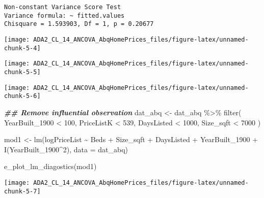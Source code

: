 \documentclass[
  12pt,
]{article}
\newenvironment{Shaded}{\begin{snugshade}}{\end{snugshade}}
\newcommand{\AttributeTok}[1]{\textcolor[rgb]{0.77,0.63,0.00}{#1}}
\newcommand{\DecValTok}[1]{\textcolor[rgb]{0.00,0.00,0.81}{#1}}
\newcommand{\DocumentationTok}[1]{\textcolor[rgb]{0.56,0.35,0.01}{\textbf{\textit{#1}}}}
\newcommand{\FunctionTok}[1]{\textcolor[rgb]{0.00,0.00,0.00}{#1}}
\newcommand{\NormalTok}[1]{#1}
\newcommand{\OtherTok}[1]{\textcolor[rgb]{0.56,0.35,0.01}{#1}}
\newcommand{\SpecialCharTok}[1]{\textcolor[rgb]{0.00,0.00,0.00}{#1}}
\begin{document}
\begin{verbatim}
Non-constant Variance Score Test 
Variance formula: ~ fitted.values 
Chisquare = 1.593903, Df = 1, p = 0.20677
\end{verbatim}

\begin{center}\texttt{[image: ADA2\_CL\_14\_ANCOVA\_AbqHomePrices\_files/figure-latex/unnamed-chunk-5-4]} \end{center}

\begin{center}\texttt{[image: ADA2\_CL\_14\_ANCOVA\_AbqHomePrices\_files/figure-latex/unnamed-chunk-5-5]} \end{center}

\begin{center}\texttt{[image: ADA2\_CL\_14\_ANCOVA\_AbqHomePrices\_files/figure-latex/unnamed-chunk-5-6]} \end{center}

\begin{Shaded}
\begin{Highlighting}[]
\DocumentationTok{\#\# Remove influential observation}
\NormalTok{  dat\_abq }\OtherTok{\textless{}{-}}
\NormalTok{    dat\_abq }\SpecialCharTok{\%\textgreater{}\%}
    \FunctionTok{filter}\NormalTok{(}
\NormalTok{      YearBuilt\_1900 }\SpecialCharTok{\textless{}} \DecValTok{100}\NormalTok{, }
\NormalTok{      PriceListK }\SpecialCharTok{\textless{}} \DecValTok{539}\NormalTok{, }
\NormalTok{      DaysListed }\SpecialCharTok{\textless{}} \DecValTok{1000}\NormalTok{, }
\NormalTok{      Size\_sqft }\SpecialCharTok{\textless{}} \DecValTok{7000}
\NormalTok{    ) }

\NormalTok{mod1 }\OtherTok{\textless{}{-}} \FunctionTok{lm}\NormalTok{(logPriceList }\SpecialCharTok{\textasciitilde{}}\NormalTok{ Beds }\SpecialCharTok{+}\NormalTok{ Size\_sqft }\SpecialCharTok{+}\NormalTok{ DaysListed }\SpecialCharTok{+}\NormalTok{ YearBuilt\_1900 }\SpecialCharTok{+} \FunctionTok{I}\NormalTok{(YearBuilt\_1900}\SpecialCharTok{\^{}}\DecValTok{2}\NormalTok{), }
           \AttributeTok{data =}\NormalTok{ dat\_abq)}

\FunctionTok{e\_plot\_lm\_diagostics}\NormalTok{(mod1)}
\end{Highlighting}
\end{Shaded}

\begin{center}\texttt{[image: ADA2\_CL\_14\_ANCOVA\_AbqHomePrices\_files/figure-latex/unnamed-chunk-5-7]} \end{center}
\end{document}

